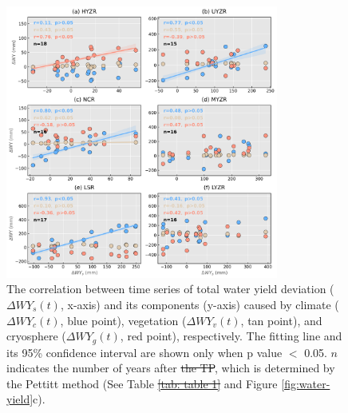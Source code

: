 \documentclass[hess, manuscript]{copernicus}
\providecommand{\DIFaddtex}[1]{{\protect\color{blue}\uwave{#1}}} %
\providecommand{\DIFdeltex}[1]{{\protect\color{red}\sout{#1}}}                      %
\providecommand{\DIFaddFL}[1]{\DIFadd{#1}} %
\providecommand{\DIFdelFL}[1]{\DIFdel{#1}} %
\providecommand{\DIFaddbeginFL}{} %
\providecommand{\DIFaddendFL}{} %
\providecommand{\DIFdelbeginFL}{} %
\providecommand{\DIFdelendFL}{} %
\providecommand{\DIFadd}[1]{\texorpdfstring{\DIFaddtex{#1}}{#1}} %
\providecommand{\DIFdel}[1]{\texorpdfstring{\DIFdeltex{#1}}{}} %
\begin{document}
\begin{figure}[ht]
    \DIFdelbeginFL %
\DIFdelendFL \DIFaddbeginFL \includegraphics[width=0.8\textwidth]{02-figures/contribution-relations.png}
    \DIFaddendFL \caption{The correlation between time series of total water yield deviation ($\Delta WY_s(t)$, x-axis) and its components (y-axis) caused by climate ($\Delta WY_c(t)$, blue point), vegetation ($\Delta WY_v(t)$, tan point), and cryosphere ($\Delta WY_g(t)$, red point), respectively. The fitting line and its 95\% confidence interval are shown only when p value $<$ 0.05. \DIFdelbeginFL \DIFdelFL{$n$ }\DIFdelendFL \DIFaddbeginFL \DIFaddFL{n }\DIFaddendFL indicates the number of years after \DIFdelbeginFL \DIFdelFL{the TP}\DIFdelendFL \DIFaddbeginFL \DIFaddFL{Tp}\DIFaddendFL , which is determined by the Pettitt method (See Table \DIFdelbeginFL \DIFdelFL{\ref{tab: table 1} }\DIFdelendFL \DIFaddbeginFL \DIFaddFL{\ref{tab:my-table} }\DIFaddendFL and Figure \ref{fig:water-yield}c).}
    \label{fig:attribution-direction}
\end{figure}
\end{document}
